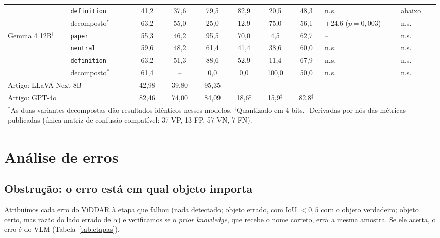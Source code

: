 \documentclass[journal,onecolumn]{IEEEtran}
\begin{document}
\begin{table}[!t]
{\begin{tabular}{llccccccll}
 & \texttt{definition} & 41,2 & 37,6 & 79,5 & 82,9 & 20,5 & 48,3 & n.s. & abaixo \\
 & decomposto$^{*}$ & 63,2 & 55,0 & 25,0 & 12,9 & 75,0 & 56,1 & +24,6 ($p=0{,}003$) & n.s. \\
\midrule
Gemma 4 12B$^\dagger$ & \texttt{paper} & 55,3 & 46,2 & 95,5 & 70,0 & 4,5 & 62,7 & -- & n.s. \\
 & \texttt{neutral} & 59,6 & 48,2 & 61,4 & 41,4 & 38,6 & 60,0 & n.s. & n.s. \\
 & \texttt{definition} & 63,2 & 51,3 & 88,6 & 52,9 & 11,4 & 67,9 & n.s. & n.s. \\
 & decomposto$^{*}$ & 61,4 & -- & 0,0 & 0,0 & 100,0 & 50,0 & n.s. & n.s. \\
\midrule
\multicolumn{2}{l}{Artigo: LLaVA-Next-8B} & 42,98 & 39,80 & 95,35 & -- & -- & -- & & \\
\multicolumn{2}{l}{Artigo: GPT-4o} & 82,46 & 74,00 & 84,09 & 18,6$^{\ddagger}$ & 15,9$^{\ddagger}$ & 82,8$^{\ddagger}$ & & \\
\bottomrule
\multicolumn{10}{L{16.2cm}}{$^{*}$As duas variantes decompostas dão resultados idênticos nesses modelos.
$^\dagger$Quantizado em 4 bits. $^{\ddagger}$Derivadas por nós das métricas publicadas (única matriz de
confusão compatível: 37 VP, 13 FP, 57 VN, 7 FN).}
\end{tabular}}
\end{table}

\section{Análise de erros}
\label{sec:erros}

\subsection{Obstrução: o erro está em qual objeto importa}
Atribuímos cada erro do ViDDAR à etapa que falhou (nada detectado; objeto errado, com IoU $<0{,}5$ com o
objeto verdadeiro; objeto certo, mas razão do lado errado de $\alpha$) e verificamos se o \emph{prior
knowledge}, que recebe o nome correto, erra a mesma amostra. Se ele acerta, o erro é do VLM
(Tabela~\ref{tab:etapas}).
\end{document}
